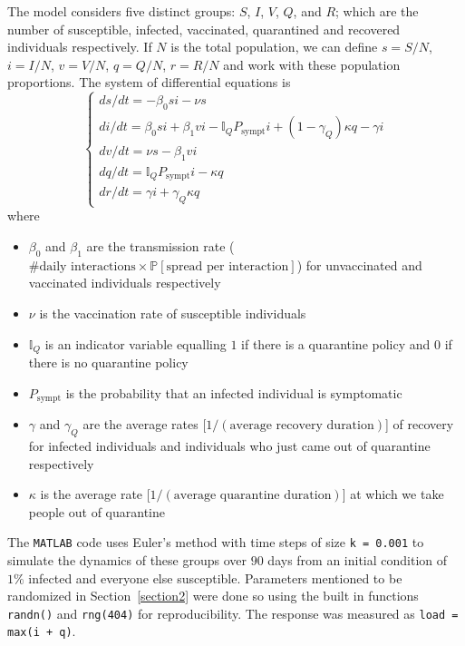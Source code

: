 \documentclass[12pt,a4paper]{article}
\begin{document}
\begin{appendices}
The model considers five distinct groups: $S$, $I$, $V$, $Q$, and $R$; which are the number of susceptible, infected, vaccinated, quarantined and recovered individuals respectively. If $N$ is the total population, we can define $s=S/N$, $i=I/N$, $v=V/N$, $q=Q/N$, $r=R/N$ and work with these population proportions. The system of differential equations is
\begin{equation}
	\begin{cases}
	ds/dt = -\beta_0si-\nu s\\
	di/dt = \beta_0si + \beta_1 vi - \mathbb{I}_QP_\text{sympt}i+(1-\gamma_Q)\kappa q - \gamma i\\
	dv/dt = \nu s - \beta_1	vi\\
	dq/dt = \mathbb{I}_QP_\text{sympt}i - \kappa q\\
	dr/dt = \gamma i +\gamma_Q\kappa q
	\end{cases}
\end{equation}
where 
\vspace*{-3mm}
\begin{itemize}
	\item $\beta_0$ and $\beta_1$ are the transmission rate ($\text{\# daily interactions}\times\mathbb{P}[\text{spread per interaction}]$) for unvaccinated and vaccinated individuals respectively
	\vspace*{-3mm}
	\item $\nu$ is the vaccination rate of susceptible individuals
	\vspace*{-3mm}
	\item $\mathbb{I}_Q$ is an indicator variable equalling $1$ if there is a quarantine policy and $0$ if there is no quarantine policy
	\vspace*{-3mm}
	\item $P_\text{sympt}$ is the probability that an infected individual is symptomatic
	\vspace*{-3mm}
	\item $\gamma$ and $\gamma_Q$ are the average rates [$1/(\text{average recovery duration})$] of recovery for infected individuals and individuals who just came out of quarantine respectively
	\vspace*{-3mm}
	\item $\kappa$ is the average rate [$1/(\text{average quarantine duration})$] at which we take people out of quarantine
\end{itemize}
The \verb`MATLAB` code uses Euler's method with time steps of size \verb`k = 0.001` to simulate the dynamics of these groups over $90$ days from an initial condition of $1\%$ infected and everyone else susceptible. Parameters mentioned to be randomized in Section~\ref{section2} were done so using the built in functions \verb`randn()` and \verb`rng(404)` for reproducibility. The response was measured as \verb`load = max(i + q)`.


\end{appendices}
\end{document}
